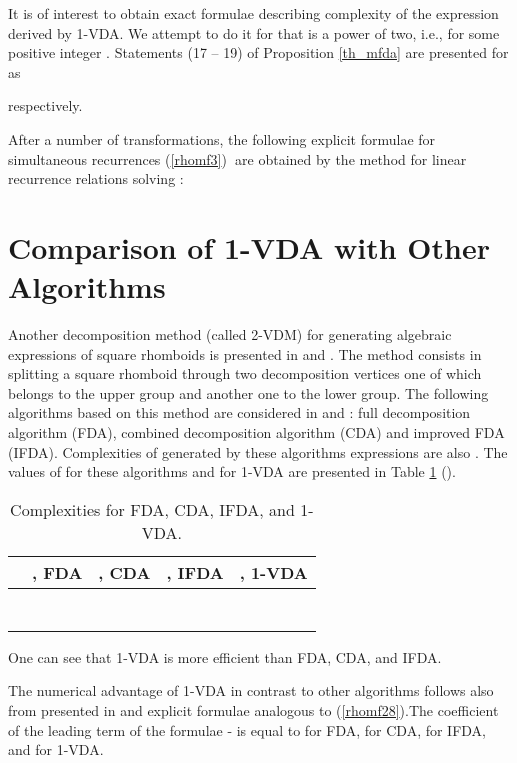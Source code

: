 \documentclass[11pt]{article}\usepackage{amsmath}
\begin{document}
It is of interest to obtain exact formulae describing complexity of the
expression  derived by 1-VDA. We attempt to do it for  that is a
power of two, i.e.,  for some positive integer . Statements
(17 -- 19) of Proposition \ref{th_mfda} are presented for   as

respectively.

After a number of transformations, the following explicit formulae for
simultaneous recurrences (\ref{rhomf3})\textbf{\ }are obtained by the method
for linear recurrence relations solving \cite{Ros}:



\section{Comparison of 1-VDA with Other Algorithms}

Another decomposition method (called 2-VDM) for generating algebraic
expressions of square rhomboids is presented in \cite{KoL2} and \cite{KoL3}.
The method consists in splitting a square rhomboid through two decomposition
vertices one of which belongs to the upper group and another one to the lower
group. The following algorithms based on this method are considered in
\cite{KoL2} and \cite{KoL3}: full decomposition algorithm (FDA), combined
decomposition algorithm (CDA) and improved FDA (IFDA). Complexities of
generated by these algorithms expressions are also . The values of  for these algorithms and for 1-VDA are
presented in Table \ref{tab1} ().
\begin{table}[tbph] \centering
\begin{tabular}
[c]{||c||c|c|c|c||}\hline\hline
 & , FDA & , CDA & , IFDA & , 1-VDA\\\hline
 &  &  &  & \\\hline
 &  &  &  & \\\hline
 &  &  &  & \\\hline
 &  &  &  & \\\hline
 &  &  &  & \\\hline
 &  &  &  & \\\hline
 &  &  &  & \\\hline\hline
\end{tabular}
\caption{Complexities for FDA, CDA, IFDA, and
1-VDA.\label{tab1}}\end{table}

One can see that 1-VDA is more efficient than FDA, CDA, and IFDA.

The numerical advantage of 1-VDA in contrast to other algorithms follows also
from presented in \cite{KoL2} and \cite{KoL3} explicit formulae analogous to
(\ref{rhomf28}).The coefficient of the leading term of the formulae -
 is equal to  for FDA,  for CDA,  for IFDA, and
 for 1-VDA.
\end{document}
